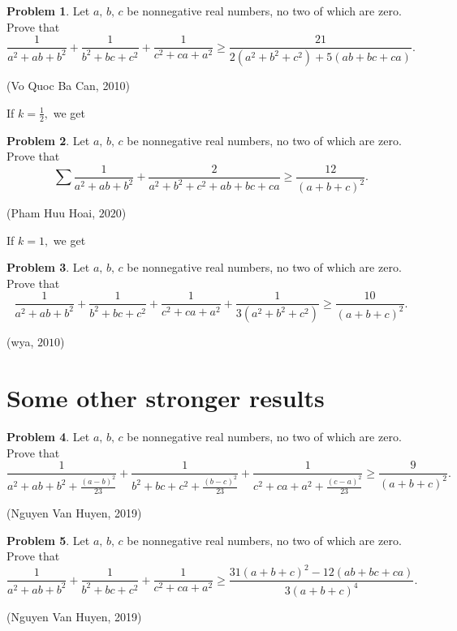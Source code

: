 \documentclass[12pt,a4paper]{book}
\theoremstyle{definition}
\newtheorem{pro}{\cmss\problemColor Problem}
\begin{document}
\begin{pro}
Let $a,\,b,\,c$ be nonnegative real numbers, no two of which are zero. Prove that
\[\frac{1}{a^2+ab+b^2}+\frac{1}{b^2+bc+c^2}+\frac{1}{c^2+ca+a^2} \ge \frac{21}{2(a^2+b^2+c^2)+5(ab+bc+ca)}.\]
\begin{flushright}
(Vo Quoc Ba Can, 2010)
\end{flushright}
\end{pro}

If $k = \frac 12,$ we get
\begin{pro}
Let $a,\,b,\,c$ be nonnegative real numbers, no two of which are zero. Prove that
\[
\sum \frac{1}{a^2+ab+b^2}+\frac{2}{a^2+b^2+c^2+ab+bc+ca}\geqslant \frac{12}{(a+b+c)^2}.
\]
\begin{flushright}
(Pham Huu Hoai, $2020$)
\end{flushright}
\end{pro}

If $k = 1,$ we get
\begin{pro}
Let $a,\,b,\,c$ be nonnegative real numbers, no two of which are zero. Prove that
\[\frac{1}{a^2+ab+b^2}+\frac{1}{b^2+bc+c^2}+\frac{1}{c^2+ca+a^2}+\frac{1}{3\left(a^{2}+b^{2}+c^{2}\right)}\geqslant \frac{10}{(a+b+c)^{2}}.\]
\begin{flushright}
(wya, $2010$)
\end{flushright}
\end{pro}

\section{Some other stronger results}

\begin{pro}
Let $a,\,b,\,c$ be nonnegative real numbers, no two of which are zero. Prove that
$$\frac{1}{a^2+a b+b^2+\frac{(a-b)^2}{23}}+\frac{1}{b^2+b c+c^2+\frac{(b-c)^2}{23}}+\frac{1}{c^2+c a+a^2+\frac{(c-a)^2}{23}} \geqslant \frac{9}{(a+b+c)^2}.$$
\begin{flushright}
(Nguyen Van Huyen, 2019)
\end{flushright}
\end{pro}

\begin{pro}
Let $a,\,b,\,c$ be nonnegative real numbers, no two of which are zero. Prove that
$$\frac{1}{a^2+a b+b^2}+\frac{1}{b^2+b c+c^2}+\frac{1}{c^2+c a+a^2} \geqslant \frac{31(a+b+c)^2-12(a b+b c+c a)}{3(a+b+c)^4}.$$
\begin{flushright}
(Nguyen Van Huyen, 2019)
\end{flushright}
\end{pro}
\end{document}
